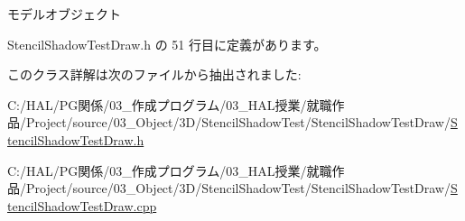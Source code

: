 モデルオブジェクト 



 Stencil\+Shadow\+Test\+Draw.\+h の 51 行目に定義があります。



このクラス詳解は次のファイルから抽出されました\+:\begin{DoxyCompactItemize}
\item 
C\+:/\+H\+A\+L/\+P\+G関係/03\+\_\+作成プログラム/03\+\_\+\+H\+A\+L授業/就職作品/\+Project/source/03\+\_\+\+Object/3\+D/\+Stencil\+Shadow\+Test/\+Stencil\+Shadow\+Test\+Draw/\mbox{\hyperlink{_stencil_shadow_test_draw_8h}{Stencil\+Shadow\+Test\+Draw.\+h}}\item 
C\+:/\+H\+A\+L/\+P\+G関係/03\+\_\+作成プログラム/03\+\_\+\+H\+A\+L授業/就職作品/\+Project/source/03\+\_\+\+Object/3\+D/\+Stencil\+Shadow\+Test/\+Stencil\+Shadow\+Test\+Draw/\mbox{\hyperlink{_stencil_shadow_test_draw_8cpp}{Stencil\+Shadow\+Test\+Draw.\+cpp}}\end{DoxyCompactItemize}
